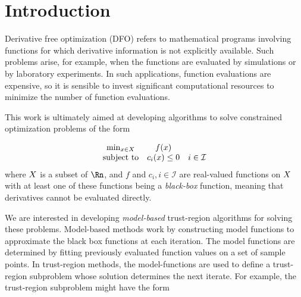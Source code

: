 
\section{Introduction}

Derivative free optimization (DFO) refers to mathematical programs involving functions for which derivative information is not explicitly available.
Such problems arise, for example, when the functions are evaluated by simulations or by laboratory experiments.
In such applications, function evaluations are expensive, so it is sensible to invest significant computational resources to minimize the number of function evaluations.

This work is ultimately aimed at developing algorithms to solve constrained optimization problems of the form 

\[ \begin{array}{ccl} \min_{x \in X} & f(x) \\
\mbox{subject to} & c_i(x) \le 0 & i \in \mathcal{I} \\
\end{array}
\]
where $X$ is a subset of $\Rn$, and $f$ and $c_i, i \in \mathcal{I}$ are real-valued functions on $X$ with at least one of these functions being a {\em black-box} function, meaning that derivatives cannot be evaluated directly.



We are interested in developing {\em model-based} trust-region algorithms for solving these problems.
Model-based methods work by constructing model functions to approximate the black box functions at each iteration.
The model functions are determined by fitting previously evaluated function values on a set of sample points.
In trust-region methods, the model-functions are used to define a trust-region subproblem whose solution determines the next iterate.
For example, the trust-region subproblem might have the form

